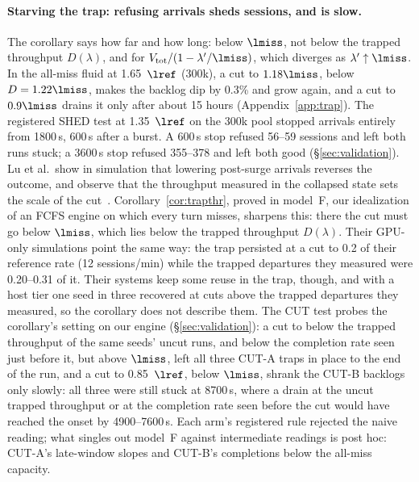 \paragraph{Starving the trap: refusing arrivals sheds sessions, and is slow.} The corollary says how far and how long: below $\lmiss$, not below the
trapped throughput $D(\lambda)$, and for $V_{\mathrm{tot}}/(1-\lambda'/\lmiss)$, which diverges as $\lambda'\uparrow\lmiss$. In
the all-miss fluid at 1.65~$\lref$ (300k), a cut to $1.18\lmiss$, below $D=1.22\lmiss$, makes the backlog dip by 0.3\% and grow
again, and a cut to $0.9\lmiss$ drains it only after about 15 hours (Appendix~\ref{app:trap}). The registered SHED test at
1.35~$\lref$ on the 300k pool stopped arrivals entirely from 1800\,s, 600\,s after a burst. A 600\,s stop refused 56--59 sessions
and left both runs stuck; a 3600\,s stop refused 355--378 and left both good (\S\ref{sec:validation}). Lu et al.\ show in
simulation that lowering post-surge arrivals reverses the outcome, and observe that the throughput measured in the collapsed state
sets the scale of the cut~\citep{lu2026cachetrap}. Corollary~\ref{cor:trapthr}, proved in model~F, our idealization of an FCFS engine on which
every turn misses, sharpens this: there the cut must go below $\lmiss$, which lies below the trapped throughput $D(\lambda)$. Their
GPU-only simulations point the same way: the trap persisted at a cut to 0.2 of their reference rate (12 sessions/min) while the
trapped departures they measured were 0.20--0.31 of it. Their
systems keep some reuse in the trap, though, and with a host tier one seed in three recovered at cuts above the trapped departures
they measured, so the corollary does not describe them. The CUT test probes the corollary's setting on our engine (\S\ref{sec:validation}): a cut to below the trapped throughput of
the same seeds' uncut runs, and below the completion rate seen just before it, but above $\lmiss$, left all three CUT-A traps in
place to the end of the run, and a cut to 0.85~$\lref$, below $\lmiss$, shrank the CUT-B backlogs only slowly: all three were still
stuck at 8700\,s, where a drain at the uncut trapped throughput or at the completion rate seen before the cut would have reached the
onset by 4900--7600\,s. Each arm's registered rule rejected the naive reading; what singles out model~F against intermediate
readings is post hoc: CUT-A's late-window slopes and CUT-B's completions below the all-miss capacity.

